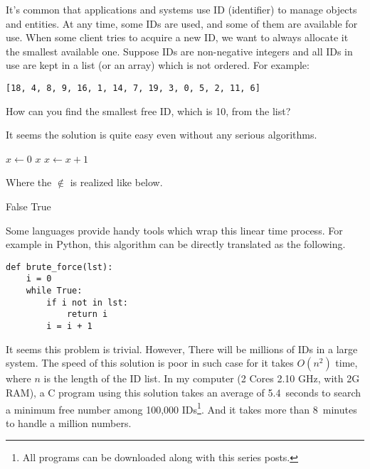 \documentclass[UTF8]{article}
\begin{document}
It's common that applications and systems use ID (identifier)
to manage objects and entities. At any time, some IDs are used, and
some of them are available for use. When some client tries to acquire
a new ID, we want to always allocate it the smallest available one.
Suppose IDs are non-negative integers and all IDs in use are kept
in a list (or an array) which is not ordered. For example:

\begin{verbatim}
[18, 4, 8, 9, 16, 1, 14, 7, 19, 3, 0, 5, 2, 11, 6]
\end{verbatim}

How can you find the smallest free ID, which is 10, from the list?

It seems the solution is quite easy even without any serious algorithms.

\begin{algorithmic}[1]
  \State $x \gets 0$
  \Loop
      \State \Return $x$
    \Else
      \State $x \gets x + 1$
    \EndIf
  \EndLoop
\EndFunction
\end{algorithmic}

Where the $\notin$ is realized like below.

\begin{algorithmic}[1]
      \State \Return False
    \EndIf
  \EndFor
  \State \Return True
\EndFunction
\end{algorithmic}

Some languages provide handy tools which wrap this linear time
process. For example in Python, this algorithm can be directly translated
as the following.

\lstset{language=Python}
\begin{lstlisting}
def brute_force(lst):
    i = 0
    while True:
        if i not in lst:
            return i
        i = i + 1
\end{lstlisting}

It seems this problem is trivial. However, There will be millions of
IDs in a large system. The speed of this solution is poor in such case for
it takes $O(n^2)$ time, where $n$ is the length of the ID list.
In my computer (2 Cores 2.10 GHz, with 2G RAM), a C program using this
solution takes an average of 5.4~seconds to search a minimum free number
among 100,000 IDs\footnote{All programs can be downloaded along
with this series posts.}. And it takes more than 8~minutes to handle
a million numbers.
\end{document}
